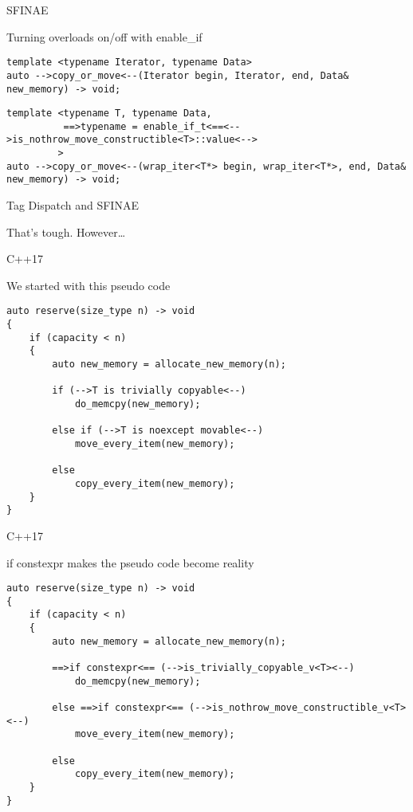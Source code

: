 \documentclass[aspectratio=169,xcolor=dvipsnames]{beamer}
\begin{document}
\begin{frame}[fragile]{SFINAE}
    \begin{block}{Turning overloads on/off with enable\_if}
        \pause
        \begin{lstlisting}
template <typename Iterator, typename Data>
auto -->copy_or_move<--(Iterator begin, Iterator, end, Data& new_memory) -> void;
        \end{lstlisting}
\pause
        \begin{lstlisting}
template <typename T, typename Data,
          ==>typename = enable_if_t<==<-->is_nothrow_move_constructible<T>::value<-->
         >
auto -->copy_or_move<--(wrap_iter<T*> begin, wrap_iter<T*>, end, Data& new_memory) -> void;
        \end{lstlisting}
    \end{block}
\end{frame}

\begin{frame}[fragile]{Tag Dispatch and SFINAE}
    \begin{block}{That's tough.}
    \pause
    However\dots
    \end{block}
\end{frame}

\begin{frame}[fragile]{C++17}
    \begin{block}{We started with this pseudo code}
        \begin{lstlisting}
auto reserve(size_type n) -> void
{
    if (capacity < n)
    {
        auto new_memory = allocate_new_memory(n);

        if (-->T is trivially copyable<--)
            do_memcpy(new_memory);

        else if (-->T is noexcept movable<--)
            move_every_item(new_memory);

        else
            copy_every_item(new_memory);
    }
}
        \end{lstlisting}
    \end{block}
\end{frame}

\begin{frame}[fragile]{C++17}
    \begin{block}{if constexpr makes the pseudo code become reality}
        \begin{lstlisting}
auto reserve(size_type n) -> void
{
    if (capacity < n)
    {
        auto new_memory = allocate_new_memory(n);

        ==>if constexpr<== (-->is_trivially_copyable_v<T><--)
            do_memcpy(new_memory);

        else ==>if constexpr<== (-->is_nothrow_move_constructible_v<T><--)
            move_every_item(new_memory);

        else
            copy_every_item(new_memory);
    }
}
        \end{lstlisting}
    \end{block}
\end{frame}
\end{document}
